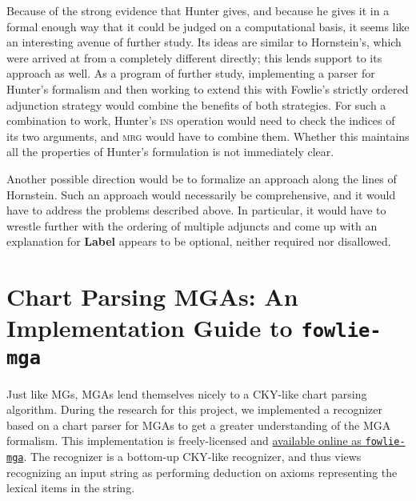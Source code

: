 \documentclass{article}
\begin{document}
Because of the strong evidence that Hunter gives, and because he gives
it in a formal enough way that it could be judged on a computational
basis, it seems like an interesting avenue of further study.  Its
ideas are similar to Hornstein's, which were arrived at from a
completely different directly; this lends support to its approach as
well.  As a program of further study, implementing a parser for
Hunter's formalism and then working to extend this with Fowlie's
strictly ordered adjunction strategy would combine the benefits of
both strategies.  For such a combination to work, Hunter's
\textsc{ins} operation would need to check the indices of its two
arguments, and \textsc{mrg} would have to combine them.  Whether this
maintains all the properties of Hunter's formulation is not
immediately clear.

Another possible direction would be to formalize an approach along the
lines of Hornstein.  Such an approach would necessarily be
comprehensive, and it would have to address the problems described
above.  In particular, it would have to wrestle further with the
ordering of multiple adjuncts and come up with an explanation for
\textbf{Label} appears to be optional, neither required nor
disallowed.




\appendix
\section{Chart Parsing MGAs: An Implementation Guide to
  \texttt{fowlie-mga}}
\label{sec:implementation}

Just like MGs, MGAs lend themselves nicely to a CKY-like chart parsing
algorithm.  During the research for this project, we implemented a
recognizer based on a chart parser for MGAs to get a greater
understanding of the MGA formalism.  This implementation is
freely-licensed and
\href{https://github.com/pniedzielski/fowlie-mga}{available online as
  \texttt{fowlie-mga}}.  The recognizer is a bottom-up CKY-like
recognizer, and thus views recognizing an input string as performing
deduction on axioms representing the lexical items in the string.


\end{document}
